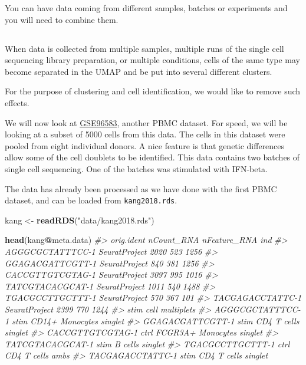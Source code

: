 \documentclass[
]{book}
\newenvironment{Shaded}{\begin{snugshade}}{\end{snugshade}}
\newcommand{\CommentTok}[1]{\textcolor[rgb]{0.56,0.35,0.01}{\textit{#1}}}
\newcommand{\FunctionTok}[1]{\textcolor[rgb]{0.13,0.29,0.53}{\textbf{#1}}}
\newcommand{\NormalTok}[1]{#1}
\newcommand{\OtherTok}[1]{\textcolor[rgb]{0.56,0.35,0.01}{#1}}
\newcommand{\SpecialCharTok}[1]{\textcolor[rgb]{0.81,0.36,0.00}{\textbf{#1}}}
\newcommand{\StringTok}[1]{\textcolor[rgb]{0.31,0.60,0.02}{#1}}
\begin{document}
You can have data coming from different samples, batches or experiments and you will need to combine them.

\subsection*{}\label{section-13}

When data is collected from multiple samples, multiple runs of the single cell sequencing library preparation, or multiple conditions, cells of the same type may become separated in the UMAP and be put into several different clusters.

For the purpose of clustering and cell identification, we would like to remove such effects.

We will now look at \href{https://www.ncbi.nlm.nih.gov/geo/query/acc.cgi?acc=GSE96583}{GSE96583}, another PBMC dataset. For speed, we will be looking at a subset of 5000 cells from this data. The cells in this dataset were pooled from eight individual donors. A nice feature is that genetic differences allow some of the cell doublets to be identified. This data contains two batches of single cell sequencing. One of the batches was stimulated with IFN-beta.

The data has already been processed as we have done with the first PBMC dataset, and can be loaded from \texttt{kang2018.rds}.

\begin{Shaded}
\begin{Highlighting}[]
\NormalTok{kang }\OtherTok{\textless{}{-}} \FunctionTok{readRDS}\NormalTok{(}\StringTok{"data/kang2018.rds"}\NormalTok{)}

\FunctionTok{head}\NormalTok{(kang}\SpecialCharTok{@}\NormalTok{meta.data)}
\CommentTok{\#\textgreater{}                     orig.ident nCount\_RNA nFeature\_RNA  ind}
\CommentTok{\#\textgreater{} AGGGCGCTATTTCC{-}1 SeuratProject       2020          523 1256}
\CommentTok{\#\textgreater{} GGAGACGATTCGTT{-}1 SeuratProject        840          381 1256}
\CommentTok{\#\textgreater{} CACCGTTGTCGTAG{-}1 SeuratProject       3097          995 1016}
\CommentTok{\#\textgreater{} TATCGTACACGCAT{-}1 SeuratProject       1011          540 1488}
\CommentTok{\#\textgreater{} TGACGCCTTGCTTT{-}1 SeuratProject        570          367  101}
\CommentTok{\#\textgreater{} TACGAGACCTATTC{-}1 SeuratProject       2399          770 1244}
\CommentTok{\#\textgreater{}                  stim              cell multiplets}
\CommentTok{\#\textgreater{} AGGGCGCTATTTCC{-}1 stim   CD14+ Monocytes    singlet}
\CommentTok{\#\textgreater{} GGAGACGATTCGTT{-}1 stim       CD4 T cells    singlet}
\CommentTok{\#\textgreater{} CACCGTTGTCGTAG{-}1 ctrl FCGR3A+ Monocytes    singlet}
\CommentTok{\#\textgreater{} TATCGTACACGCAT{-}1 stim           B cells    singlet}
\CommentTok{\#\textgreater{} TGACGCCTTGCTTT{-}1 ctrl       CD4 T cells       ambs}
\CommentTok{\#\textgreater{} TACGAGACCTATTC{-}1 stim       CD4 T cells    singlet}
\end{Highlighting}
\end{Shaded}
\end{document}
